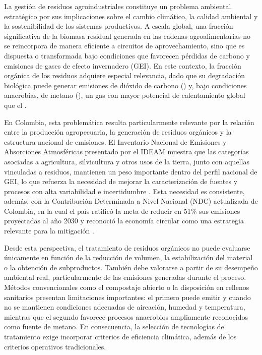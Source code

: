 
La gestión de residuos agroindustriales constituye un problema ambiental estratégico
por sus implicaciones sobre el cambio climático, la calidad ambiental y la
sostenibilidad de los sistemas productivos. A escala global, una fracción
significativa de la biomasa residual generada en las cadenas agroalimentarias no
se reincorpora de manera eficiente a circuitos de aprovechamiento, sino que es
dispuesta o transformada bajo condiciones que favorecen pérdidas de carbono y
emisiones de gases de efecto invernadero (GEI). En este contexto, la fracción
orgánica de los residuos adquiere especial relevancia, dado que su degradación
biológica puede generar emisiones de dióxido de carbono () y, bajo
condiciones anaerobias, de metano (), un gas con mayor potencial de
calentamiento global que el .

En Colombia, esta problemática resulta particularmente relevante por la relación
entre la producción agropecuaria, la generación de residuos orgánicos y la
estructura nacional de emisiones. El Inventario Nacional de Emisiones y
Absorciones Atmosféricas presentado por el IDEAM muestra que las categorías
asociadas a agricultura, silvicultura y otros usos de la tierra, junto con
aquellas vinculadas a residuos, mantienen un peso importante dentro del perfil
nacional de GEI, lo que refuerza la necesidad de mejorar la caracterización de
fuentes y procesos con alta variabilidad e incertidumbre
\parencite{ideam2021inventario}.
Esta necesidad es consistente, además, con la Contribución Determinada a Nivel
Nacional (NDC) actualizada de Colombia, en la cual el país ratificó la meta de
reducir en 51\% sus emisiones proyectadas al año 2030 y reconoció la economía
circular como una estrategia relevante para la mitigación
\parencite{tiriaACTUALIZACIONCONTRIBUCIONDETERMINADA}.

Desde esta perspectiva, el tratamiento de residuos orgánicos no puede evaluarse
únicamente en función de la reducción de volumen, la estabilización del material
o la obtención de subproductos. También debe valorarse a partir de su desempeño
ambiental real, particularmente de las emisiones generadas durante el proceso.
Métodos convencionales como el compostaje abierto o la disposición en rellenos
sanitarios presentan limitaciones importantes: el primero puede emitir
 y  cuando no se mantienen condiciones adecuadas de aireación,
humedad y temperatura, mientras que el segundo favorece procesos anaerobios
ampliamente reconocidos como fuente de metano. En consecuencia, la selección de
tecnologías de tratamiento exige incorporar criterios de eficiencia climática,
además de los criterios operativos tradicionales.

